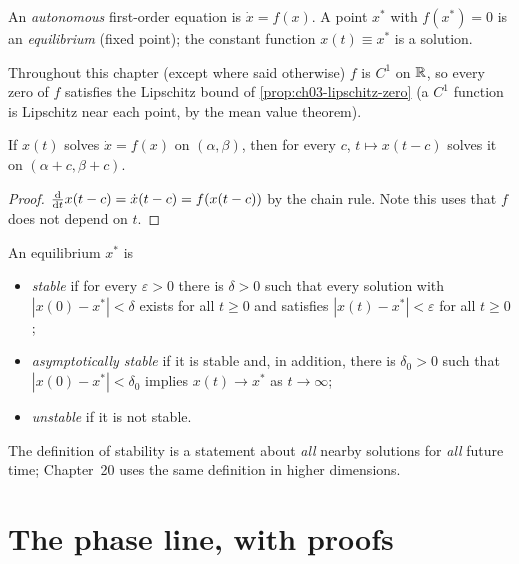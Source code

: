 \begin{definition}\label{def:ch07-autonomous}
An \emph{autonomous} first-order equation is $\dot x = f(x)$. A point $x^*$ with
$f(x^*) = 0$ is an \emph{equilibrium} (fixed point); the constant function
$x(t)\equiv x^*$ is a solution.
\end{definition}

Throughout this chapter (except where said otherwise) $f$ is $C^1$ on $\mathbb{R}$, so
every zero of $f$ satisfies the Lipschitz bound of
\cref{prop:ch03-lipschitz-zero} (a $C^1$ function is Lipschitz near each point,
by the mean value theorem).

\begin{proposition}\label{prop:ch07-translation}
If $x(t)$ solves $\dot x = f(x)$ on $(\alpha,\beta)$, then for every $c$,
$t\mapsto x(t - c)$ solves it on $(\alpha + c,\beta + c)$.
\end{proposition}
\begin{proof}
$\frac{\mathrm{d}}{\mathrm{d}t}x(t-c) = \dot x(t-c) = f(x(t-c))$ by the chain rule. Note this uses
that $f$ does not depend on $t$.
\end{proof}

\begin{definition}[Stability]\label{def:ch07-stability}
An equilibrium $x^*$ is
\begin{itemize}
  \item \emph{stable} if for every $\varepsilon>0$ there is $\delta>0$ such that
        every solution with $|x(0) - x^*|<\delta$ exists for all $t\ge0$ and
        satisfies $|x(t) - x^*|<\varepsilon$ for all $t\ge 0$;
  \item \emph{asymptotically stable} if it is stable and, in addition, there is
        $\delta_0>0$ such that $|x(0) - x^*|<\delta_0$ implies $x(t)\to x^*$ as
        $t\to\infty$;
  \item \emph{unstable} if it is not stable.
\end{itemize}
\end{definition}

The definition of stability is a statement about \emph{all} nearby solutions
for \emph{all} future time; Chapter~20 uses the same definition in higher
dimensions.

\section{The phase line, with proofs}\label{sec:ch07-theory}

